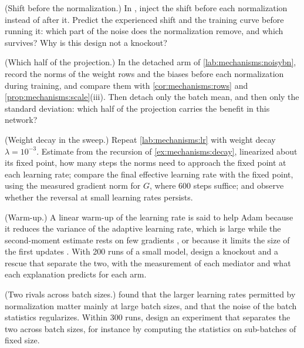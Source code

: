 \begin{refsection}
\begin{exercises}
\item \labwork (Shift before the normalization.) In , inject the shift before each normalization instead of after it. Predict the experienced shift and the training curve before running it: which part of the noise does the normalization remove, and which survives? Why is this design not a knockout?\label{ex:mechanisms:before}

\item \labwork (Which half of the projection.) In the detached arm of \cref{lab:mechanisms:noisybn}, record the norms of the weight rows and the biases before each normalization during training, and compare them with \cref{cor:mechanisms:rows} and \cref{prop:mechanisms:scale}(iii). Then detach only the batch mean, and then only the standard deviation: which half of the projection carries the benefit in this network?\label{ex:mechanisms:detached}

\item \labwork (Weight decay in the sweep.) Repeat \cref{lab:mechanisms:lr} with weight decay $\lambda=10^{-3}$. Estimate from the recursion of \cref{ex:mechanisms:decay}, linearized about its fixed point, how many steps the norms need to approach the fixed point at each learning rate; compare the final effective learning rate with the fixed point, using the measured gradient norm for $G$, where 600 steps suffice; and observe whether the reversal at small learning rates persists.\label{ex:mechanisms:lrdecay}

\item \design (Warm-up.) A linear warm-up of the learning rate is said to help Adam because it reduces the variance of the adaptive learning rate, which is large while the second-moment estimate rests on few gradients \parencite{LiuEtAl2020}, or because it limits the size of the first updates \parencite{MaYarats2021}. With 200 runs of a small model, design a knockout and a rescue that separate the two, with the measurement of each mediator and what each explanation predicts for each arm.\label{ex:mechanisms:warmup}

\item \design (Two rivals across batch sizes.) \Textcite{DeSmith2020} found that the larger learning rates permitted by normalization matter mainly at large batch sizes, and \textcite{LuoEtAl2019} that the noise of the batch statistics regularizes. Within 300 runs, design an experiment that separates the two across batch sizes, for instance by computing the statistics on sub-batches of fixed size.\label{ex:mechanisms:batch}


\end{exercises}
\end{refsection}
